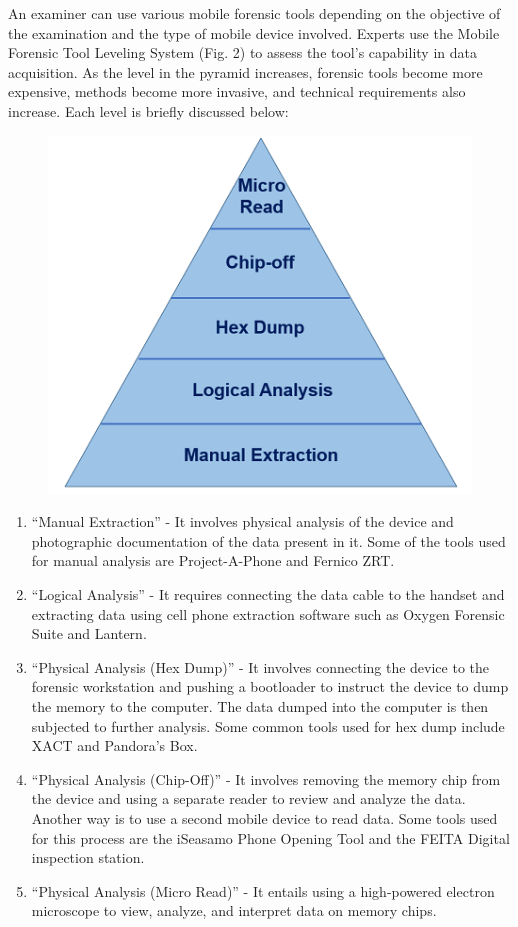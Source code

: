 \documentclass[11pt]{article}
\begin{document}
An examiner can use various mobile forensic tools depending on the objective of the examination and the type of mobile device involved. Experts use the Mobile Forensic Tool Leveling System (Fig. 2) to assess the tool's capability in data acquisition. As the level in the pyramid increases, forensic tools become more expensive, methods become more invasive, and technical requirements also increase. Each level is briefly discussed below:

\begin{figure}[H]
    \centering
    \includegraphics[width=.45\textwidth]{./leveling_tool8743754519123385858.png}
    \caption{}
\end{figure}

\begin{enumerate}
    \item ``Manual Extraction'' - It involves physical analysis of the device and photographic documentation of the data present in it. Some of the tools used for manual analysis are Project-A-Phone and Fernico ZRT.
    \item ``Logical Analysis'' - It requires connecting the data cable to the handset and extracting data using cell phone extraction software such as Oxygen Forensic Suite and Lantern.
    \item ``Physical Analysis (Hex Dump)'' - It involves connecting the device to the forensic workstation and pushing a bootloader to instruct the device to dump the memory to the computer. The data dumped into the computer is then subjected to further analysis. Some common tools used for hex dump include XACT and Pandora's Box.
    \item ``Physical Analysis (Chip-Off)'' - It involves removing the memory chip from the device and using a separate reader to review and analyze the data. Another way is to use a second mobile device to read data. Some tools used for this process are the iSeasamo Phone Opening Tool and the FEITA Digital inspection station.
    \item ``Physical Analysis (Micro Read)'' - It entails using a high-powered electron microscope to view, analyze, and interpret data on memory chips.
\end{enumerate}
\end{document}
